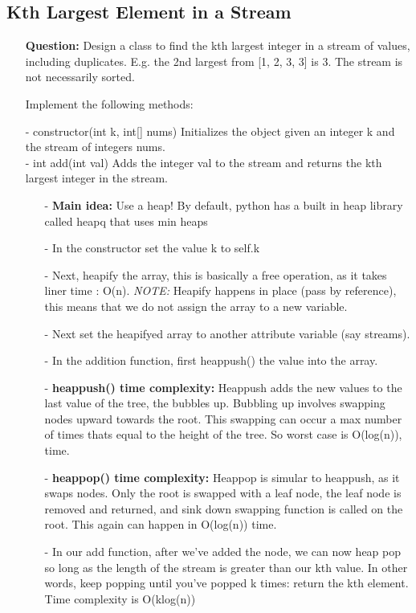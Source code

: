 \documentclass[12pt]{article}
\begin{document}
\subsection{Kth Largest Element in a Stream}
\begin{enumerate}
  \item[] \textbf{Question:} 
    Design a class to find the kth largest integer in a stream of values, including duplicates. E.g. the 2nd largest from [1, 2, 3, 3] is 3. The stream is not necessarily sorted.

Implement the following methods:

 - constructor(int k, int[] nums) Initializes the object given an integer k and the stream of integers nums.\\
 - int add(int val) Adds the integer val to the stream and returns the kth largest integer in the stream.



    \begin{enumerate}
      \item[-] \textbf{Main idea:} Use a heap! By default, python has a built in heap library called heapq that uses min heaps
      \item[-] In the constructor set the value k to self.k 
      \item[-] Next, heapify the array, this is basically a free operation, as it takes liner time : O(n). \textit{NOTE:} Heapify happens in place (pass by reference), this means that we do not assign the array to a new variable. 
      \item[-] Next set the heapifyed array to another attribute variable (say streams).
      \item[-] In the addition function, first heappush() the value into the array. 
      \item[-] \textbf{heappush() time complexity: } Heappush adds the new values to the last value of the tree, the bubbles up. Bubbling up involves swapping nodes upward towards the root. This swapping can occur a max number of times thats equal to the height of the tree. So worst case is O(log(n)), time.
      \item[-] \textbf{heappop() time complexity: } Heappop is simular to heappush, as it swaps nodes. Only the root is swapped with a leaf node, the leaf node is removed and returned, and sink down swapping function is called on the root. This again can happen in O(log(n)) time. 
      \item[-] In our add function, after we've added the node, we can now heap pop so long as the length of the stream is greater than our kth value. In other words, keep popping until you've popped k times: return the kth element. Time complexity is O(klog(n))
    \end{enumerate}
\end{enumerate}
\end{document}

